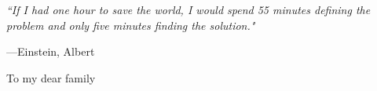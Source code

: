 \documentclass[12pt,a4paper]{Thesis} %
\begin{document}



\pagestyle{empty} %
\emph{``If I had one hour to save the world, I would spend 55 minutes defining the problem and only five minutes finding the solution."}

\begin{flushright}
---Einstein, Albert
\end{flushright}
\null\vfill %

\begin{center}
\large{To my dear family}
\end{center}
\vfill\vfill\null %
\cleardoublepage %

\pagestyle{fancy} %
\fancyhead{}   %
\fancyhead[LO]{\sl{\leftmark}}
\fancyhead[RE]{\sl{\rightmark}}
\fancyhead[LE,RO]{\thepage}




\end{document}
